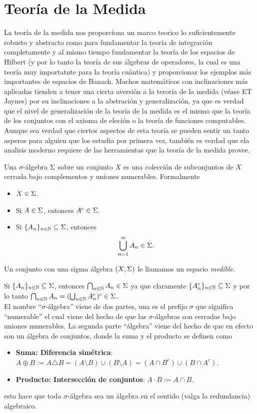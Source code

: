 \documentclass[main.tex]{subfiles}
\begin{document}
\section{Teoría de la Medida}
\noindent La teoría de la medida nos proporciona un marco teorico lo suficientemente robusto y abstracto como para fundamentar la teoría de integración completamente y al mismo tiempo fundamentar la teoría de los espacios de Hilbert (y por lo tanto la teoría de sus álgebras de operadores, la cual es una teoría muy importatnte para la teoría cuántica) y proporcionar los ejemplos más importantes de espacios de Banach. Muchos matemáticos con inclinaciones más aplicadas tienden a tener una cierta aversión a la teroría de la medida (véase ET Jaynes) por su inclinaciones a la abstración y generalización, ya que es verdad que el nivel de generalización de la teoría de la medida es el mismo que la teoría de los conjuntos con el axioma de eleción o la teoría de funciones computables. Aunque sea verdad que ciertos aspectos de esta teoría se pueden sentir un tanto asperos para alguien que los estudia por primera vez, también es verdad que ela analisis moderno requiere de las herramientas que la teoría de la medida provee.

\begin{def.}
Una $\sigma$-álgebra $\Sigma$ sobre un conjunto $X$ es una colección de subconjuntos de $X$ cerrada bajo complementos y uniones numerables. Formalmente
\begin{itemize}
    \item $X \in \Sigma$.
    \item Si $A \in \Sigma$, entonces $A^c \in \Sigma$.
    \item Si $\{A_n\}_{n \in \mathbb N } \subseteq \Sigma$, entonces
      \[
      \bigcup_{n=1}^\infty A_n \in \Sigma.
      \]
\end{itemize}
Un conjunto con una sigma álgebra $(X,\Sigma)$ le llamamos un espacio \emph{medible}.
\end{def.}
\obs Si $\{A_n\}_{n \in \mathbb{N}} \subseteq \Sigma$, entonces $\bigcap_{n\in \mathbb N } A_n \in \Sigma$ ya que claramente $\{A_n^c\}_{n \in \mathbb{N}} \subseteq \Sigma$ y por lo tanto $\bigcap_{n\in \mathbb N } A_n=(\bigcup_{n\in \mathbb N } A_n^c)^c\in\Sigma$.\\
\obs El nombre ``$\sigma$-álgebra'' viene de dos partes, una es el prefijo $\sigma$ que significa ``numerable'' el cual viene del hecho de que las $\sigma$-álgebras son cerradas bajo uniones numerables. La segunda parte ``álgebra'' viene del hecho de que en efecto son un álgebra de conjuntos, donde la suma y el producto se definen como
\begin{itemize}
    \item \textbf{Suma: Diferencia simétrica}: $A\oplus B:=A\triangle B=(A\setminus B)\cup(B\setminus A)=(A\cap B^c)\cup(B\cap A^c)$.
    \item \textbf{Producto: Intersección de conjuntos}: $A\cdot B:= A\cap B$.
\end{itemize}
esto hace que toda $\sigma$-álgebra sea un álgebra en el sentido (valga la redundancia) algebraico.
\end{document}
